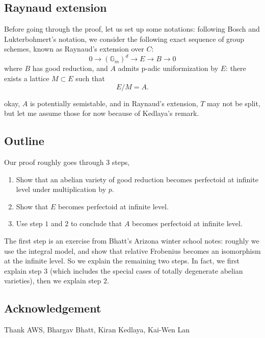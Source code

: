 \documentclass[11pt,oneside]{amsart}
\theoremstyle{theorem}
\theoremstyle{definition}
\theoremstyle{remark}
\begin{document}
\subsection{Raynaud extension}
Before going through the proof, let us set up some notations: following Bosch and Lukterbohmert's notation, we consider the following exact sequence of group schemes, known as Raynaud's extension over $C$: 
$$ 0 \rightarrow (\mathbb G_m)^d \rightarrow E \rightarrow B \rightarrow 0 $$  where $B$ has good reduction, and $A$ admits p-adic uniformization by $E$: there exists a lattice $M \subset E$ such that 
$$ E/M = A.$$

{\color{red} okay, $A$ is potentially semistable, and in Raynaud's extension, $T$ may not be split, but let me assume those for now because of Kedlaya's remark. }



\subsection{Outline}
Our proof roughly goes through 3 steps, 
\begin{enumerate}
\item Show that an abelian variety of good reduction becomes perfectoid at infinite level under multiplication by $p$. 
\item Show that $E$ becomes perfectoid at infinite level. 
\item Use step $1$ and $2$ to conclude that $A$ becomes perfectoid at infinite level. 
\end{enumerate}

The first step is an exercise from Bhatt's Arizona winter school notes: roughly we use the integral model, and show that relative Frobenius becomes an isomorphism at the infinite level. So we explain the remaining two steps. In fact, we first explain step $3$ (which includes the special cases of totally degenerate abelian varieties), then we explain step $2$. 



\subsection{Acknowledgement}

Thank AWS, Bhargav Bhatt, Kiran Kedlaya, Kai-Wen Lan 

\end{document}
